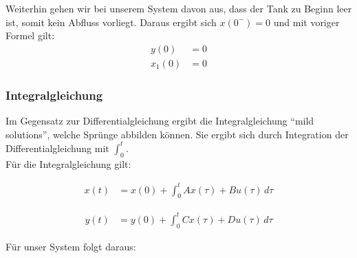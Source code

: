 Weiterhin gehen wir bei unserem System davon aus, dass der Tank zu Beginn leer ist, somit kein Abfluss vorliegt. Daraus ergibt sich $x(0^-) = 0$ und mit voriger Formel gilt:
\begin{align*}
    y(0) &= 0 \\
    x_1(0) &= 0
\end{align*}


\subsubsection{Integralgleichung}
Im Gegensatz zur Differentialgleichung ergibt die Integralgleichung \enquote{mild solutions}, welche Sprünge abbilden können. Sie ergibt sich durch Integration der Differentialgleichung mit $\int_{0}^{t}$. \\
Für die Integralgleichung gilt:

\noindent
\begin{minipage}{.5\linewidth}   
    \begin{align*}
        x(t) & = x(0) + \int_{0}^{t} Ax(\tau) + Bu(\tau)\,d\tau
    \end{align*}
\end{minipage}
\begin{minipage}{.5\linewidth}   
    \begin{align*}
        y(t) & = y(0) + \int_{0}^{t} Cx(\tau) + Du(\tau)\,d\tau
    \end{align*}
\end{minipage}

Für unser System folgt daraus:

